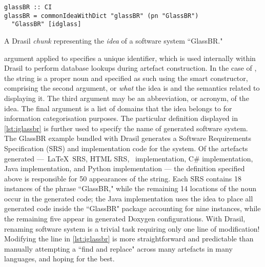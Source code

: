 \begin{listing}[H]
\begin{tcolorbox}
\begin{verbatim}
glassBR :: CI
glassBR = commonIdeaWithDict "glassBR" (pn "GlassBR")
  "GlassBR" [idglass]
\end{verbatim}
\end{tcolorbox}
\caption{A Drasil \textit{chunk} representing the \textit{idea} of a software system ``GlassBR."}
\label{lst:iglassbr}
\end{listing}

\noindent argument applied to  specifies a unique identifier, which is used internally within Drasil to perform database lookups during artefact construction. In the case of , the string  is a proper noun and specified as such using the  smart constructor, comprising the second argument, or \textit{what} the idea is and the semantics related to displaying it. The third argument may be an abbreviation, or acronym, of the idea. The final argument is a list of domains that the idea belongs to for information categorisation purposes. The particular definition displayed in \autoref{lst:iglassbr} is further used to specify the name of generated software system. The GlassBR example bundled with Drasil generates a Software Requirements Specification (SRS) and implementation code for the system. Of the artefacts generated ---\ \LaTeX\ SRS, HTML SRS, \CC~implementation, C\# implementation, Java implementation, and Python implementation --- the  definition specified above is responsible for 50 appearances of the string. Each SRS contains 18 instances of the phrase ``GlassBR," while the remaining 14 locations of the noun occur in the generated code; the Java implementation uses the idea to place all generated code inside the ``GlassBR" package accounting for nine instances, while the remaining five appear in generated Doxygen configurations. With Drasil, renaming software system is a trivial task requiring only one line of modification! Modifying the line in \autoref{lst:iglassbr} is more straightforward and predictable than manually attempting a ``find and replace" across many artefacts in many languages, and hoping for the best.


